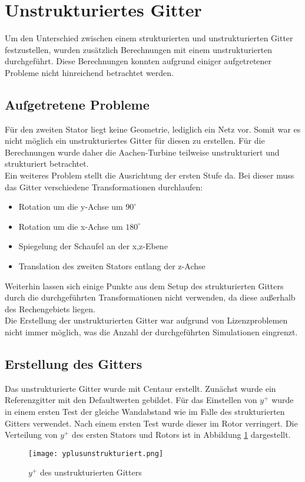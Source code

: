 \section{Unstrukturiertes Gitter}
Um den Unterschied zwischen einem strukturierten und unstrukturierten Gitter festzustellen, wurden zusätzlich Berechnungen mit einem unstrukturierten durchgeführt. Diese Berechnungen konnten aufgrund einiger aufgetretener Probleme nicht hinreichend betrachtet werden.

\subsection{Aufgetretene Probleme}
Für den zweiten Stator liegt keine Geometrie, lediglich ein Netz vor. Somit war es nicht möglich ein unstrukturiertes Gitter für diesen zu erstellen. Für die Berechnungen wurde daher die Aachen-Turbine teilweise unstrukturiert und strukturiert betrachtet.\\
Ein weiteres Problem stellt die Ausrichtung der ersten Stufe da.
Bei dieser muss das Gitter verschiedene Transformationen durchlaufen:
\begin{itemize}
\item Rotation um die y-Achse um $90^\circ$
\item Rotation um die x-Achse um $180^\circ$
\item Spiegelung der Schaufel an der x,z-Ebene
\item Translation des zweiten Stators entlang der z-Achse
\end{itemize}
Weiterhin lassen sich einige Punkte aus dem Setup des strukturierten Gitters durch die durchgeführten Transformationen nicht verwenden, da diese außerhalb des Rechengebiets liegen.\\
Die Erstellung der unstrukturierten Gitter war aufgrund von Lizenzproblemen nicht immer möglich, was die Anzahl der durchgeführten Simulationen eingrenzt.
\subsection{Erstellung des Gitters}
Das unstrukturierte Gitter wurde mit Centaur erstellt. Zunächst wurde ein Referenzgitter mit den Defaultwerten gebildet. Für das Einstellen von $y^+$ wurde in einem ersten Test der gleiche Wandabstand wie im Falle des strukturierten Gitters verwendet. Nach einem ersten Test wurde dieser im Rotor verringert. Die Verteilung von $y^+$ des ersten Stators und Rotors ist in Abbildung \ref{yplusunstrukturiert} dargestellt.
\begin{figure}[htbp]
	\centering
	\texttt{[image: yplusunstrukturiert.png]}
	\caption{$y^+$ des unstrukturierten Gitters} \label{yplusunstrukturiert}
\end{figure}
